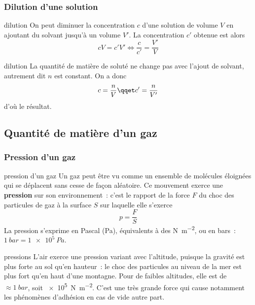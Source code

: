 \documentclass[../main/main.tex]{subfiles}
\begin{document}
\subsubsection{Dilution d'une solution}

\begin{tcbraster}[raster columns=2, raster equal height=rows]
    \begin{prop}[label=prop:dilu]{dilution}
        On peut diminuer la concentration $c$ d'une solution de volume $V$ en
        ajoutant du solvant jusqu'à un volume $V'$. La concentration $c'$
        obtenue est alors
        \[\boxed{cV = c'V'}
          \Longleftrightarrow
          \boxed{\frac{c}{c'} = \frac{V'}{V}}
      \]
    \end{prop}
    \begin{demo}[label=demo:dilu]{dilution}
        La quantité de matière de soluté ne change pas avec l'ajout de solvant,
        autrement dit $n$ est constant. On a donc
        \[ c = \frac{n}{V} \qqet c' = \frac{n}{V'}\]
        d'où le résultat.
    \end{demo}
\end{tcbraster}

\subsection{Quantité de matière d'un gaz}
\subsubsection{Pression d'un gaz}

\begin{tcbraster}[raster columns=2, raster equal height=rows]
    \begin{defi}[label=def:pression]{pression d'un gaz}
        Un gaz peut être vu comme un ensemble de molécules éloignées qui se
        déplacent sans cesse de façon aléatoire. Ce mouvement exerce une
        \textbf{pression} sur son environnement~: c'est le rapport de la force
        $F$ du choc des particules de gaz à la surface $S$ sur laquelle elle
        s'exerce
        \[ p = \frac{F}{S}\]
        La pression s'exprime en Pascal (Pa), équivalents à des \si{N.m^{-2}},
        ou en bars~: $\SI{1}{bar} = \SI{1e5}{Pa}$.
    \end{defi}
    \begin{exem}[label=exem:pression]{pressions}
        L'air exerce une pression variant avec l'altitude, puisque la gravité
        est plus forte au sol qu'en hauteur~: le choc des particules au niveau
        de la mer est plus fort qu'en haut d'une montagne. Pour de faibles
        altitudes, elle est de $\approx \SI{1}{bar}$, soit \SI{e5}{N.m^{-2}}.
        C'est une très grande force qui cause notamment les phénomènes d'adhésion en cas
        de vide autre part.
    \end{exem}
\end{tcbraster}
\end{document}
